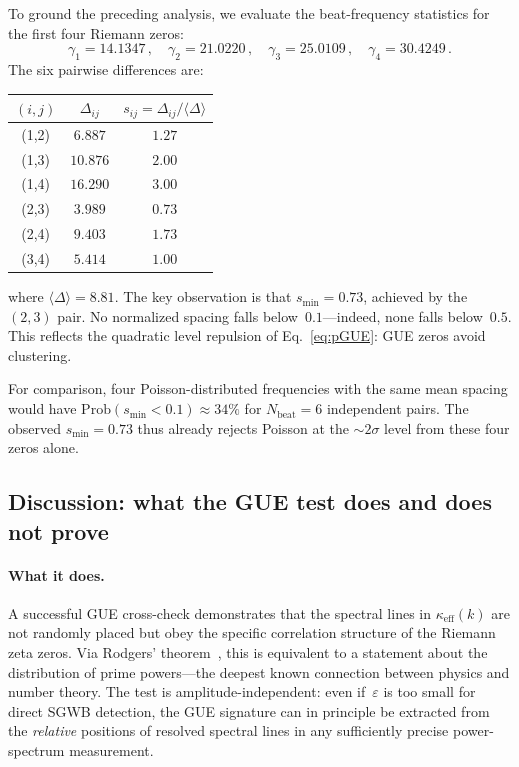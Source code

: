\documentclass[12pt,a4paper]{article}
\begin{document}
To ground the preceding analysis, we evaluate the
beat-frequency statistics for the first four Riemann zeros:
\begin{equation}\label{eq:firstzeros}
  \gamma_1 = 14.1347\,,\quad
  \gamma_2 = 21.0220\,,\quad
  \gamma_3 = 25.0109\,,\quad
  \gamma_4 = 30.4249\,.
\end{equation}
The six pairwise differences are:
\begin{center}
\renewcommand{\arraystretch}{1.2}
\begin{tabular}{ccc}
\hline
$(i,j)$ & $\Delta_{ij}$ & $s_{ij} = \Delta_{ij}/\langle\Delta\rangle$ \\
\hline
(1,2) & $6.887$ & $1.27$ \\
(1,3) & $10.876$ & $2.00$ \\
(1,4) & $16.290$ & $3.00$ \\
(2,3) & $3.989$ & $0.73$ \\
(2,4) & $9.403$ & $1.73$ \\
(3,4) & $5.414$ & $1.00$ \\
\hline
\end{tabular}
\end{center}
where $\langle\Delta\rangle = 8.81$.
The key observation is that
$s_{\min} = 0.73$, achieved by the $(2,3)$ pair.
No normalized spacing falls below~$0.1$---indeed,
none falls below~$0.5$.
This reflects the quadratic level repulsion
of Eq.~\eqref{eq:pGUE}: GUE zeros avoid clustering.

For comparison, four Poisson-distributed frequencies
with the same mean spacing would have
$\mathrm{Prob}(s_{\min}<0.1)\approx 34\%$
for $N_{\mathrm{beat}}=6$ independent pairs.
The observed $s_{\min}=0.73$ thus already rejects
Poisson at the $\sim\!2\sigma$ level from these four
zeros alone.


\subsection{Discussion: what the GUE test does and does not prove}
\label{sec:gue-discussion}

\paragraph{What it does.}
A successful GUE cross-check demonstrates that the
spectral lines in $\kappa_{\mathrm{eff}}(k)$ are not
randomly placed but obey the specific correlation
structure of the Riemann zeta zeros.
Via Rodgers' theorem~\cite{Rodgers2018}, this
is equivalent to a statement about the distribution
of prime powers---the deepest known connection between
physics and number theory.
The test is amplitude-independent: even if~$\varepsilon$
is too small for direct SGWB detection, the GUE
signature can in principle be extracted from the
\emph{relative} positions of resolved spectral lines
in any sufficiently precise power-spectrum measurement.
\end{document}
